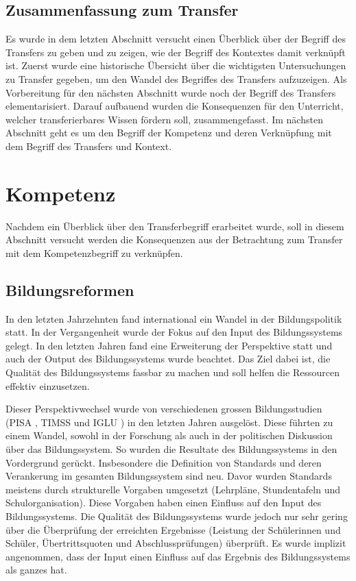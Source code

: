 \subsection{Zusammenfassung zum Transfer}

Es wurde in dem letzten Abschnitt versucht einen Überblick über der Begriff des Transfers zu geben und zu zeigen, wie der Begriff des Kontextes damit verknüpft ist. Zuerst wurde eine historische Übersicht über die wichtigsten Untersuchungen zu Transfer gegeben, um den Wandel des Begriffes des Transfers aufzuzeigen.  Als Vorbereitung für den nächsten Abschnitt wurde noch der Begriff des Transfers elementarisiert. Darauf aufbauend wurden die Konsequenzen für den Unterricht, welcher transferierbares Wissen fördern soll, zusammengefasst. Im nächsten Abschnitt geht es um den Begriff der Kompetenz und deren Verknüpfung mit dem Begriff des Transfers und Kontext.


\section{Kompetenz}

Nachdem ein Überblick über den Transferbegriff erarbeitet wurde, soll in diesem Abschnitt versucht werden die Konsequenzen aus der Betrachtung zum Transfer mit dem Kompetenzbegriff zu verknüpfen.

\subsection{Bildungsreformen}
In den letzten Jahrzehnten fand international ein Wandel in der Bildungspolitik statt. In der Vergangenheit wurde der Fokus auf den Input des Bildungssystems gelegt. In den letzten Jahren fand eine Erweiterung der Perspektive statt und auch der Output des Bildungssystems wurde beachtet. Das Ziel dabei ist, die Qualität des Bildungssystems fassbar zu machen und soll helfen die Ressourcen effektiv einzusetzen.

Dieser Perspektivwechsel wurde von verschiedenen grossen Bildungsstudien (PISA \citep{PISA-KonsortiumDeuschland2004}, TIMSS \citep{Martin2003} und IGLU \citep{Bos2003}) in den letzten Jahren ausgelöst. Diese führten zu einem Wandel, sowohl in der Forschung als auch in der politischen Diskussion über das Bildungssystem. So wurden die Resultate des Bildungssystems in den Vordergrund gerückt. Insbesondere die Definition von Standards und deren Verankerung im gesamten Bildungssystem sind neu. Davor wurden Standards meistens durch strukturelle Vorgaben umgesetzt (Lehrpläne, Stundentafeln und Schulorganisation). Diese Vorgaben haben einen Einfluss auf den Input des Bildungssystems. Die Qualität des Bildungssystems wurde jedoch nur sehr gering über die Überprüfung der erreichten Ergebnisse (Leistung der Schülerinnen und Schüler, Übertrittsquoten und Abschlussprüfungen) überprüft. Es wurde implizit angenommen, dass der Input einen Einfluss auf das Ergebnis des Bildungssystems als ganzes hat. 

